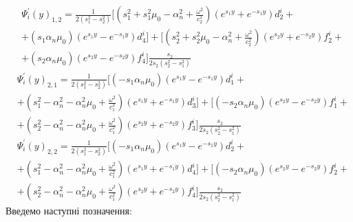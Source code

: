 \begin{align*}
    &\Psi_i^{'}(y)_{1,2}= \frac{1}{2 (s_1^2 - s_2^2)} [(s_1^2 + s_1^2 \mu_0 - \alpha_n^2 + \frac{\omega^2}{c_2^2}) (e^{s_1 y} + e^{-s_1 y}) d_2^i + \\
    &+ (s_1 \alpha_n \mu_0) (e^{s_1 y} - e^{-s_1 y}) d_4^i ]
    + [(s_2^2 + s_2^2 \mu_0 - \alpha_n^2 + \frac{\omega^2}{c_2^2}) (e^{s_2 y} + e^{-s_2 y}) f_2^i + \\
    &+ (s_2 \alpha_n \mu_0) (e^{s_2 y} - e^{-s_2 y}) f_4^i ] \frac{s_2}{2 s_2 (s_2^2 - s_1^2)}
\end{align*}
\begin{align*}
    &\Psi_i^{'}(y)_{2,1}= \frac{1}{2 (s_1^2 - s_2^2)} [(-s_1 \alpha_n \mu_0) (e^{s_1 y} - e^{-s_1 y}) d_1^i + \\
    &+ (s_1^2 - \alpha_n^2 - \alpha_n^2\mu_0 + \frac{\omega^2}{c_1^2}) (e^{s_1 y} + e^{-s_1 y}) d_3^i ]
    + [(-s_2 \alpha_n \mu_0) (e^{s_2 y} - e^{-s_2 y}) f_1^i + \\
    &+ (s_2^2 - \alpha_n^2 - \alpha_n^2\mu_0 + \frac{\omega^2}{c_1^2}) (e^{s_2 y} + e^{-s_2 y}) f_3^i ] \frac{s_2}{2 s_2 (s_2^2 - s_1^2)}
\end{align*}
\begin{align*}
    &\Psi_i^{'}(y)_{2,2}= \frac{1}{2 (s_1^2 - s_2^2)} [(-s_1 \alpha_n \mu_0) (e^{s_1 y} - e^{-s_1 y}) d_2^i + \\
    &+ (s_1^2 - \alpha_n^2 - \alpha_n^2\mu_0 + \frac{\omega^2}{c_1^2}) (e^{s_1 y} + e^{-s_1 y}) d_4^i ]
    + [(-s_2 \alpha_n \mu_0) (e^{s_2 y} - e^{-s_2 y}) f_2^i + \\
    &+ (s_2^2 - \alpha_n^2 - \alpha_n^2\mu_0 + \frac{\omega^2}{c_1^2}) (e^{s_2 y} + e^{-s_2 y}) f_4^i ] \frac{s_2}{2 s_2 (s_2^2 - s_1^2)}
\end{align*}
Введемо наступні позначення:
